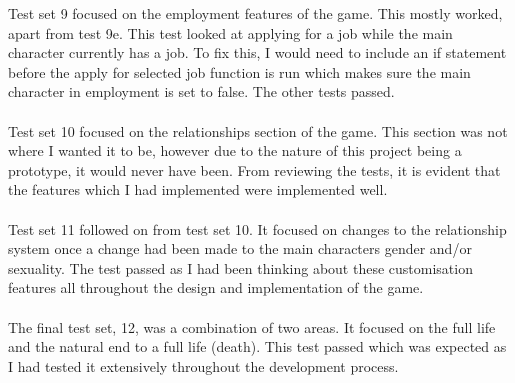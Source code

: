 Test set 9 focused on the employment features of the game. This mostly worked, apart from test 9e. This test looked at applying for a job while the main character currently has a job. To fix this, I would need to include an if statement before the apply for selected job function is run which makes sure the main character in employment is set to false. The other tests passed. \\ \\
Test set 10 focused on the relationships section of the game. This section was not where I wanted it to be, however due to the nature of this project being a prototype, it would never have been. From reviewing the tests, it is evident that the features which I had implemented were implemented well. \\ \\
Test set 11 followed on from test set 10. It focused on changes to the relationship system once a change had been made to the main characters gender and/or sexuality. The test passed as I had been thinking about these customisation features all throughout the design and implementation of the game. \\ \\
The final test set, 12, was a combination of two areas. It focused on the full life and the natural end to a full life (death). This test passed which was expected as I had tested it extensively throughout the development process. 



